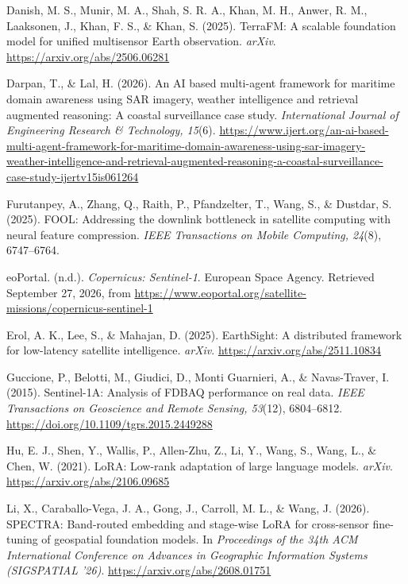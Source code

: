 \documentclass[11pt]{article}
\newcommand{\refentry}[1]{\par\noindent\hangindent=0.4in\hangafter=1 #1\par\medskip}
\begin{document}
\refentry{Danish, M. S., Munir, M. A., Shah, S. R. A., Khan, M. H., Anwer, R. M., Laaksonen, J., Khan, F. S., \& Khan, S. (2025). TerraFM: A scalable foundation model for unified multisensor Earth observation. \textit{arXiv}. \url{https://arxiv.org/abs/2506.06281}}

\refentry{Darpan, T., \& Lal, H. (2026). An AI based multi-agent framework for maritime domain awareness using SAR imagery, weather intelligence and retrieval augmented reasoning: A coastal surveillance case study. \textit{International Journal of Engineering Research \& Technology, 15}(6). \url{https://www.ijert.org/an-ai-based-multi-agent-framework-for-maritime-domain-awareness-using-sar-imagery-weather-intelligence-and-retrieval-augmented-reasoning-a-coastal-surveillance-case-study-ijertv15is061264}}

\refentry{Furutanpey, A., Zhang, Q., Raith, P., Pfandzelter, T., Wang, S., \& Dustdar, S. (2025). FOOL: Addressing the downlink bottleneck in satellite computing with neural feature compression. \textit{IEEE Transactions on Mobile Computing, 24}(8), 6747--6764.}

\refentry{eoPortal. (n.d.). \textit{Copernicus: Sentinel-1}. European Space Agency. Retrieved September 27, 2026, from \url{https://www.eoportal.org/satellite-missions/copernicus-sentinel-1}}

\refentry{Erol, A. K., Lee, S., \& Mahajan, D. (2025). EarthSight: A distributed framework for low-latency satellite intelligence. \textit{arXiv}. \url{https://arxiv.org/abs/2511.10834}}

\refentry{Guccione, P., Belotti, M., Giudici, D., Monti Guarnieri, A., \& Navas-Traver, I. (2015). Sentinel-1A: Analysis of FDBAQ performance on real data. \textit{IEEE Transactions on Geoscience and Remote Sensing, 53}(12), 6804--6812. \url{https://doi.org/10.1109/tgrs.2015.2449288}}

\refentry{Hu, E. J., Shen, Y., Wallis, P., Allen-Zhu, Z., Li, Y., Wang, S., Wang, L., \& Chen, W. (2021). LoRA: Low-rank adaptation of large language models. \textit{arXiv}. \url{https://arxiv.org/abs/2106.09685}}

\refentry{Li, X., Caraballo-Vega, J. A., Gong, J., Carroll, M. L., \& Wang, J. (2026). SPECTRA: Band-routed embedding and stage-wise LoRA for cross-sensor fine-tuning of geospatial foundation models. In \textit{Proceedings of the 34th ACM International Conference on Advances in Geographic Information Systems (SIGSPATIAL '26)}. \url{https://arxiv.org/abs/2608.01751}}
\end{document}
